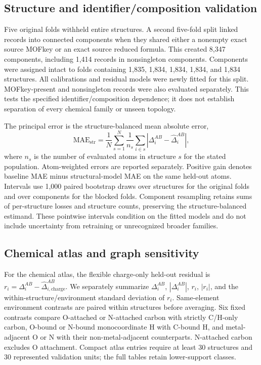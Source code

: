 \subsection{Structure and identifier/composition validation}
Five original folds withheld entire structures. A second five-fold split linked records into connected components when they shared either a nonempty exact source MOFkey\cite{Bucior2019} or an exact source reduced formula. This created 8,347 components, including 1,414 records in nonsingleton components. Components were assigned intact to folds containing 1,835, 1,834, 1,834, 1,834, and 1,834 structures. All calibrations and residual models were newly fitted for this split. MOFkey-present and nonsingleton records were also evaluated separately. This tests the specified identifier/composition dependence; it does not establish separation of every chemical family or unseen topology.

The principal error is the structure-balanced mean absolute error,
\begin{equation}
 \mathrm{MAE}_{\mathrm{str}}=\frac{1}{N}\sum_{s=1}^{N}
 \frac{1}{n_s}\sum_{i\in s}\left|\Delta_i^{AB}-\widehat{\Delta}_i^{AB}\right|,
\end{equation}
where $n_s$ is the number of evaluated atoms in structure $s$ for the stated population. Atom-weighted errors are reported separately. Positive gain denotes baseline MAE minus structural-model MAE on the same held-out atoms. Intervals use 1,000 paired bootstrap draws over structures for the original folds and over components for the blocked folds. Component resampling retains sums of per-structure losses and structure counts, preserving the structure-balanced estimand. These pointwise intervals condition on the fitted models and do not include uncertainty from retraining or unrecognized broader families.

\subsection{Chemical atlas and graph sensitivity}
For the chemical atlas, the flexible charge-only held-out residual is $r_i=\Delta_i^{AB}-\widehat{\Delta}_{i,\mathrm{charge}}^{AB}$. We separately summarize $\Delta_i^{AB}$, $|\Delta_i^{AB}|$, $r_i$, $|r_i|$, and the within-structure/environment standard deviation of $r_i$. Same-element environment contrasts are paired within structures before averaging. Six fixed contrasts compare O-attached or N-attached carbon with strictly C/H-only carbon, O-bound or N-bound monocoordinate H with C-bound H, and metal-adjacent O or N with their non-metal-adjacent counterparts. N-attached carbon excludes O attachment. Compact atlas entries require at least 30 structures and 30 represented validation units; the full tables retain lower-support classes.


